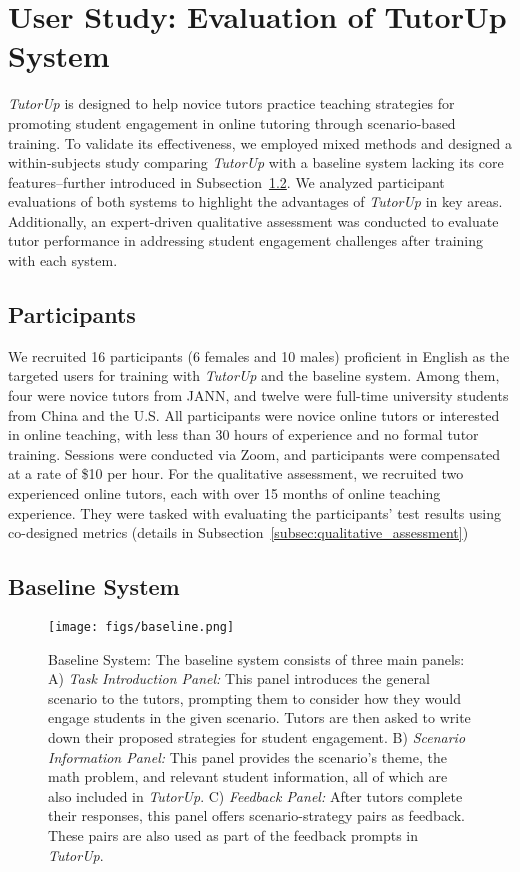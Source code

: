 \section{User Study: Evaluation of TutorUp System}
\label{sec:user_study}

\textit{TutorUp} is designed to help novice tutors practice teaching strategies for promoting student engagement in online tutoring through scenario-based training. To validate its effectiveness, we employed mixed methods and designed a within-subjects study comparing \textit{TutorUp} with a baseline system lacking its core features--further introduced in Subsection~\ref{subsec:baseline}. We analyzed participant evaluations of both systems to highlight the advantages of \textit{TutorUp} in key areas. Additionally, an expert-driven qualitative assessment was conducted to evaluate tutor performance in addressing student engagement challenges after training with each system. 

\subsection{Participants} 
\label{subsec:participants}

We recruited 16 participants (6 females and 10 males) proficient in English as the targeted users for training with \textit{TutorUp} and the baseline system. Among them, four were novice tutors from JANN, and twelve were full-time university students from China and the U.S. All participants were novice online tutors or interested in online teaching, with less than 30 hours of experience and no formal tutor training. Sessions were conducted via Zoom, and participants were compensated at a rate of \$10 per hour. 
%
For the qualitative assessment, we recruited two experienced online tutors, each with over 15 months of online teaching experience. They were tasked with evaluating the participants' test results using co-designed metrics (details in Subsection~\ref{subsec:qualitative_assessment})

\subsection{Baseline System}
\label{subsec:baseline}

\begin{figure*}
    \centering
    \texttt{[image: figs/baseline.png]}
    \caption{Baseline System: The baseline system consists of three main panels:  A) \textit{Task Introduction Panel: }This panel introduces the general scenario to the tutors, prompting them to consider how they would engage students in the given scenario. Tutors are then asked to write down their proposed strategies for student engagement.  B) \textit{Scenario Information Panel:} This panel provides the scenario's theme, the math problem, and relevant student information, all of which are also included in \textit{TutorUp}.  C) \textit{Feedback Panel:} After tutors complete their responses, this panel offers scenario-strategy pairs as feedback. These pairs are also used as part of the feedback prompts in \textit{TutorUp}.}
    \label{fig:baseline}
\end{figure*} 


